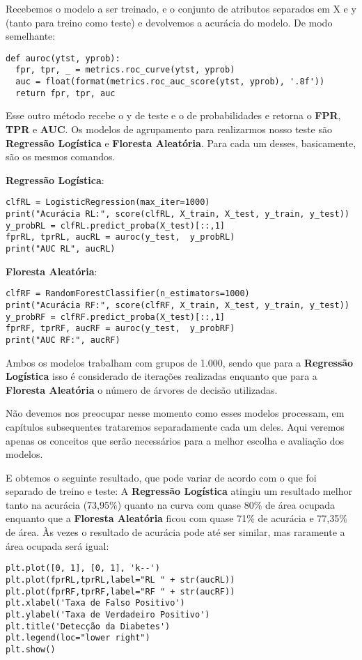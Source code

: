 Recebemos o modelo a ser treinado, e o conjunto de atributos separados em X e y (tanto para treino como teste) e devolvemos a acurácia do modelo. De modo semelhante:
\begin{lstlisting}[]
def auroc(ytst, yprob):
  fpr, tpr, _ = metrics.roc_curve(ytst, yprob)
  auc = float(format(metrics.roc_auc_score(ytst, yprob), '.8f'))
  return fpr, tpr, auc 
\end{lstlisting}

Esse outro método recebe o y de teste e o de probabilidades e retorna o \textbf{FPR}, \textbf{TPR} e \textbf{AUC}. Os modelos de agrupamento para realizarmos nosso teste são \textbf{Regressão Logística} e \textbf{Floresta Aleatória}. Para cada um desses, basicamente, são os mesmos comandos.

\textbf{Regressão Logística}:
\begin{lstlisting}[]
clfRL = LogisticRegression(max_iter=1000)
print("Acurácia RL:", score(clfRL, X_train, X_test, y_train, y_test))
y_probRL = clfRL.predict_proba(X_test)[::,1]
fprRL, tprRL, aucRL = auroc(y_test,  y_probRL)
print("AUC RL", aucRL)
\end{lstlisting}

\textbf{Floresta Aleatória}:
\begin{lstlisting}[]
clfRF = RandomForestClassifier(n_estimators=1000)
print("Acurácia RF:", score(clfRF, X_train, X_test, y_train, y_test))
y_probRF = clfRF.predict_proba(X_test)[::,1]
fprRF, tprRF, aucRF = auroc(y_test,  y_probRF)
print("AUC RF:", aucRF)
\end{lstlisting}

Ambos os modelos trabalham com grupos de 1.000, sendo que para a \textbf{Regressão Logística} isso é considerado de iterações realizadas enquanto que para a \textbf{Floresta Aleatória} o número de árvores de decisão utilizadas. 

\begin{note} 
	Não devemos nos preocupar nesse momento como esses modelos processam, em capítulos subsequentes trataremos separadamente cada um deles. Aqui veremos apenas os conceitos que serão necessários para a melhor escolha e avaliação dos modelos.
\end{note}

E obtemos o seguinte resultado, que pode variar de acordo com o que foi separado de treino e teste: A \textbf{Regressão Logística} atingiu um resultado melhor tanto na acurácia (73,95\%) quanto na curva com quase 80\% de área ocupada enquanto que a \textbf{Floresta Aleatória} ficou com quase 71\% de acurácia e 77,35\% de área. Às vezes o resultado de acurácia pode até ser similar, mas raramente a área ocupada será igual:
\begin{lstlisting}[]
plt.plot([0, 1], [0, 1], 'k--')
plt.plot(fprRL,tprRL,label="RL " + str(aucRL))
plt.plot(fprRF,tprRF,label="RF " + str(aucRF))
plt.xlabel('Taxa de Falso Positivo')
plt.ylabel('Taxa de Verdadeiro Positivo')
plt.title('Detecção da Diabetes')
plt.legend(loc="lower right")
plt.show()
\end{lstlisting}

